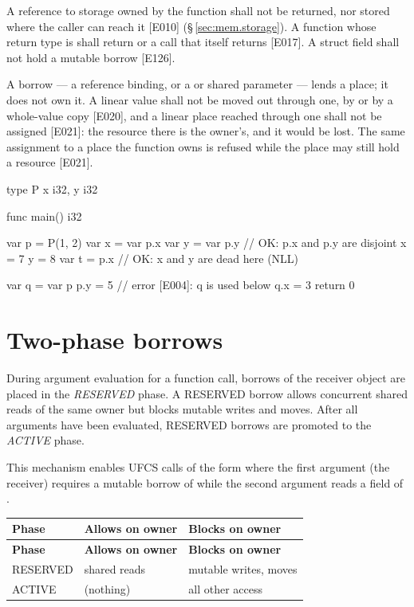 \pnum
A reference to storage owned by the function shall not be returned, nor stored where the
caller can reach it [E010] (\S\,\ref{sec:mem.storage}).  A function whose
return type is  shall return  or a call that itself returns
 [E017].  A struct field shall not hold a mutable borrow [E126].

\pnum
A borrow --- a reference binding, or a  or shared parameter --- lends a place; it
does not own it.  A linear value shall not be moved out through one, by  or by a
whole-value copy [E020], and a linear place reached through one shall not be assigned [E021]:
the resource there is the owner's, and it would be lost.  The same assignment to a place the
function owns is refused while the place may still hold a resource [E021].

\begin{example}
\begin{laincode}
type P { x i32, y i32 }

func main() i32 {
    var p = P(1, 2)
    var x = var p.x
    var y = var p.y          // OK: p.x and p.y are disjoint
    x = 7
    y = 8
    var t = p.x              // OK: x and y are dead here (NLL)

    var q = var p
    p.y = 5                  // error [E004]: q is used below
    q.x = 3
    return 0
}
\end{laincode}
\end{example}

\section{Two-phase borrows}
\label{sec:own.two-phase}

\pnum
During argument evaluation for a function call, borrows of the receiver
object are placed in the \textit{RESERVED} phase.  A RESERVED borrow
allows concurrent shared reads of the same owner but blocks mutable writes
and moves.  After all arguments have been evaluated, RESERVED borrows are
promoted to the \textit{ACTIVE} phase.

\pnum
This mechanism enables UFCS calls of the form  where
the first argument (the receiver) requires a mutable borrow of 
while the second argument reads a field of .

\begin{longtable}{@{}lll@{}}
\toprule
\textbf{Phase} & \textbf{Allows on owner} & \textbf{Blocks on owner} \\
\midrule
\endfirsthead
\toprule
\textbf{Phase} & \textbf{Allows on owner} & \textbf{Blocks on owner} \\
\midrule
\endhead
\bottomrule
\endlastfoot
RESERVED & shared reads & mutable writes, moves \\
ACTIVE   & (nothing)    & all other access \\
\end{longtable}

